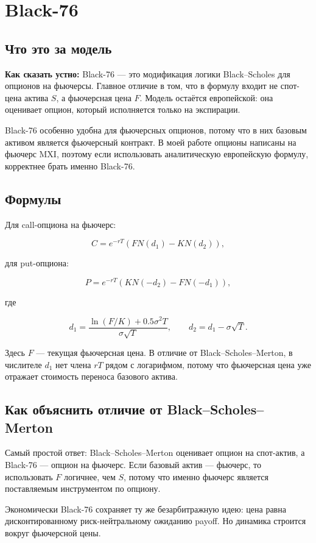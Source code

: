 \documentclass[11pt,a4paper]{article}
\newcommand{\speechbox}[1]{%
  \noindent\colorbox{softblue}{%
    \parbox{\dimexpr\linewidth-2\fboxsep\relax}{\textbf{Как сказать устно:} #1}%
  }\par\vspace{0.2em}
}
\begin{document}
\section{Black-76}

\subsection{Что это за модель}

\speechbox{Black-76 --- это модификация логики Black--Scholes для опционов на фьючерсы. Главное отличие в том, что в формулу входит не спот-цена актива $S$, а фьючерсная цена $F$. Модель остаётся европейской: она оценивает опцион, который исполняется только на экспирации.}

Black-76 особенно удобна для фьючерсных опционов, потому что в них базовым активом является фьючерсный контракт. В моей работе опционы написаны на фьючерс MXI, поэтому если использовать аналитическую европейскую формулу, корректнее брать именно Black-76.

\subsection{Формулы}

Для call-опциона на фьючерс:

\[
C=e^{-rT}\left(FN(d_1)-KN(d_2)\right),
\]

для put-опциона:

\[
P=e^{-rT}\left(KN(-d_2)-FN(-d_1)\right),
\]

где

\[
d_1=\frac{\ln(F/K)+0.5\sigma^2T}{\sigma\sqrt{T}},
\qquad
d_2=d_1-\sigma\sqrt{T}.
\]

Здесь $F$ --- текущая фьючерсная цена. В отличие от Black--Scholes--Merton, в числителе $d_1$ нет члена $rT$ рядом с логарифмом, потому что фьючерсная цена уже отражает стоимость переноса базового актива.

\subsection{Как объяснить отличие от Black--Scholes--Merton}

Самый простой ответ: Black--Scholes--Merton оценивает опцион на спот-актив, а Black-76 --- опцион на фьючерс. Если базовый актив --- фьючерс, то использовать $F$ логичнее, чем $S$, потому что именно фьючерс является поставляемым инструментом по опциону.

Экономически Black-76 сохраняет ту же безарбитражную идею: цена равна дисконтированному риск-нейтральному ожиданию payoff. Но динамика строится вокруг фьючерсной цены.
\end{document}
